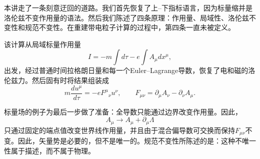 本讲走了一条刻意迂回的道路。我们首先恢复了上--下指标语言，因为标量缩并是洛伦兹不变作用量的语法。然后我们陈述了四条原理：作用量、局域性、洛伦兹不变性和规范不变性。在重建带电粒子计算的过程中，第四条一直未被定义。

该计算从局域标量作用量
\begin{equation}
I
=
-m\int d\tau
-e\int A_\mu dx^\mu,
\end{equation}
出发，经过普通时间拉格朗日量和每一个Euler--Lagrange导数，恢复了电和磁的洛伦兹力。然后固有时将结果组装成
\begin{equation}
m\frac{du^\mu}{d\tau}
=
-eF^\mu{}_\nu u^\nu,
\qquad
F_{\mu\nu}
=
\partial_\mu A_\nu-\partial_\nu A_\mu.
\end{equation}

标量场的例子为最后一步做了准备：全导数只能通过边界改变作用量。因此，
\begin{equation}
A_\mu\longrightarrow A_\mu+\partial_\mu\Lambda
\end{equation}
只通过固定的端点值改变世界线作用量，并且由于混合偏导数可交换而保持\(F_{\mu\nu}\)不变。因此，矢量势是必要的，但不是唯一的。规范不变性所陈述的是：这种不唯一性属于描述，而不属于物理。
